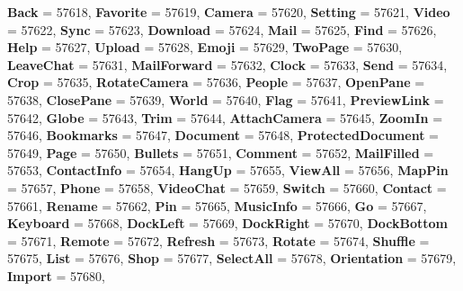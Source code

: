 \begin{DoxyCompactItemize}
{\bfseries Back} = 57618, 
{\bfseries Favorite} = 57619, 
{\bfseries Camera} = 57620, 
{\bfseries Setting} = 57621, 
\newline
{\bfseries Video} = 57622, 
{\bfseries Sync} = 57623, 
{\bfseries Download} = 57624, 
{\bfseries Mail} = 57625, 
\newline
{\bfseries Find} = 57626, 
{\bfseries Help} = 57627, 
{\bfseries Upload} = 57628, 
{\bfseries Emoji} = 57629, 
\newline
{\bfseries Two\+Page} = 57630, 
{\bfseries Leave\+Chat} = 57631, 
{\bfseries Mail\+Forward} = 57632, 
{\bfseries Clock} = 57633, 
\newline
{\bfseries Send} = 57634, 
{\bfseries Crop} = 57635, 
{\bfseries Rotate\+Camera} = 57636, 
{\bfseries People} = 57637, 
\newline
{\bfseries Open\+Pane} = 57638, 
{\bfseries Close\+Pane} = 57639, 
{\bfseries World} = 57640, 
{\bfseries Flag} = 57641, 
\newline
{\bfseries Preview\+Link} = 57642, 
{\bfseries Globe} = 57643, 
{\bfseries Trim} = 57644, 
{\bfseries Attach\+Camera} = 57645, 
\newline
{\bfseries Zoom\+In} = 57646, 
{\bfseries Bookmarks} = 57647, 
{\bfseries Document} = 57648, 
{\bfseries Protected\+Document} = 57649, 
\newline
{\bfseries Page} = 57650, 
{\bfseries Bullets} = 57651, 
{\bfseries Comment} = 57652, 
{\bfseries Mail\+Filled} = 57653, 
\newline
{\bfseries Contact\+Info} = 57654, 
{\bfseries Hang\+Up} = 57655, 
{\bfseries View\+All} = 57656, 
{\bfseries Map\+Pin} = 57657, 
\newline
{\bfseries Phone} = 57658, 
{\bfseries Video\+Chat} = 57659, 
{\bfseries Switch} = 57660, 
{\bfseries Contact} = 57661, 
\newline
{\bfseries Rename} = 57662, 
{\bfseries Pin} = 57665, 
{\bfseries Music\+Info} = 57666, 
{\bfseries Go} = 57667, 
\newline
{\bfseries Keyboard} = 57668, 
{\bfseries Dock\+Left} = 57669, 
{\bfseries Dock\+Right} = 57670, 
{\bfseries Dock\+Bottom} = 57671, 
\newline
{\bfseries Remote} = 57672, 
{\bfseries Refresh} = 57673, 
{\bfseries Rotate} = 57674, 
{\bfseries Shuffle} = 57675, 
\newline
{\bfseries List} = 57676, 
{\bfseries Shop} = 57677, 
{\bfseries Select\+All} = 57678, 
{\bfseries Orientation} = 57679, 
\newline
{\bfseries Import} = 57680, 

\end{DoxyCompactItemize}
